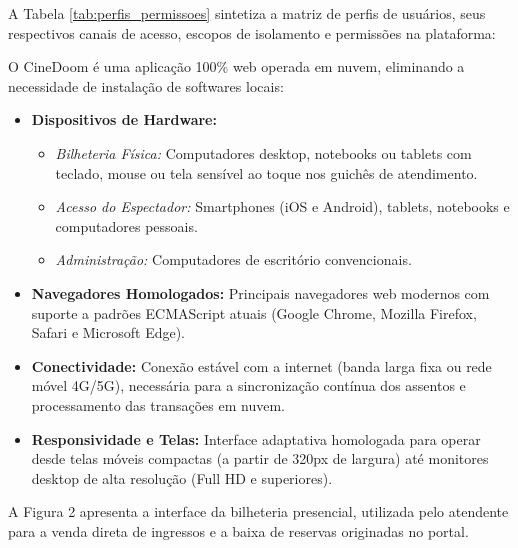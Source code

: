 A Tabela \ref{tab:perfis_permissoes} sintetiza a matriz de perfis de usuários, seus respectivos canais de acesso, escopos de isolamento e permissões na plataforma:



O CineDoom é uma aplicação 100\% web operada em nuvem, eliminando a necessidade de instalação de softwares locais:

\begin{itemize}
\tightlist
\item \textbf{Dispositivos de Hardware:}
  \begin{itemize}
  \tightlist
  \item \emph{Bilheteria Física:} Computadores desktop, notebooks ou tablets com teclado, mouse ou tela sensível ao toque nos guichês de atendimento.
  \item \emph{Acesso do Espectador:} Smartphones (iOS e Android), tablets, notebooks e computadores pessoais.
  \item \emph{Administração:} Computadores de escritório convencionais.
  \end{itemize}
\item \textbf{Navegadores Homologados:} Principais navegadores web modernos com suporte a padrões ECMAScript atuais (Google Chrome, Mozilla Firefox, Safari e Microsoft Edge).
\item \textbf{Conectividade:} Conexão estável com a internet (banda larga fixa ou rede móvel 4G/5G), necessária para a sincronização contínua dos assentos e processamento das transações em nuvem.
\item \textbf{Responsividade e Telas:} Interface adaptativa homologada para operar desde telas móveis compactas (a partir de 320px de largura) até monitores desktop de alta resolução (Full HD e superiores).
\end{itemize}

A Figura 2 apresenta a interface da bilheteria presencial, utilizada pelo atendente para a venda direta de ingressos e a baixa de reservas originadas no portal.


